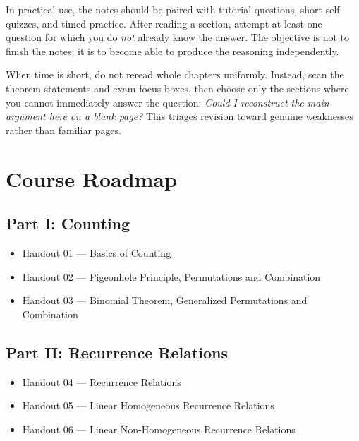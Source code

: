 \documentclass[12pt]{article}
\begin{document}
In practical use, the notes should be paired with tutorial questions, short self-quizzes, and timed practice. After reading a section, attempt at least one question for which you do \emph{not} already know the answer. The objective is not to finish the notes; it is to become able to produce the reasoning independently.

\begin{extension}[title={Using these notes at high intensity near an exam}]
When time is short, do not reread whole chapters uniformly. Instead, scan the theorem statements and exam-focus boxes, then choose only the sections where you cannot immediately answer the question: \emph{Could I reconstruct the main argument here on a blank page?} This triages revision toward genuine weaknesses rather than familiar pages.
\end{extension}

\newpage

\section*{Course Roadmap}

\subsection*{Part I: Counting}
\begin{itemize}[leftmargin=*]
    \item Handout 01 --- Basics of Counting
    \item Handout 02 --- Pigeonhole Principle, Permutations and Combination
    \item Handout 03 --- Binomial Theorem, Generalized Permutations and Combination
\end{itemize}

\subsection*{Part II: Recurrence Relations}
\begin{itemize}[leftmargin=*]
    \item Handout 04 --- Recurrence Relations
    \item Handout 05 --- Linear Homogeneous Recurrence Relations
    \item Handout 06 --- Linear Non-Homogeneous Recurrence Relations
\end{itemize}
\end{document}
